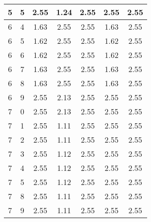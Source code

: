 \begin{longtable}{|c|c||c||c|c||c|c|}
	5 & 5 & 2.55 & 1.24 & 2.55 & 2.55 & 2.55 \\ \hline
	6 & 4 & 1.63 & 2.55 & 2.55 & 1.63 & 2.55 \\ \hline
	6 & 5 & 1.62 & 2.55 & 2.55 & 1.62 & 2.55 \\ \hline
	6 & 6 & 1.62 & 2.55 & 2.55 & 1.62 & 2.55 \\ \hline
	6 & 7 & 1.63 & 2.55 & 2.55 & 1.63 & 2.55 \\ \hline
	6 & 8 & 1.63 & 2.55 & 2.55 & 1.63 & 2.55 \\ \hline
	6 & 9 & 2.55 & 2.13 & 2.55 & 2.55 & 2.55 \\ \hline
	7 & 0 & 2.55 & 2.13 & 2.55 & 2.55 & 2.55 \\ \hline
	7 & 1 & 2.55 & 1.11 & 2.55 & 2.55 & 2.55 \\ \hline
	7 & 2 & 2.55 & 1.11 & 2.55 & 2.55 & 2.55 \\ \hline
	7 & 3 & 2.55 & 1.12 & 2.55 & 2.55 & 2.55 \\ \hline
	7 & 4 & 2.55 & 1.12 & 2.55 & 2.55 & 2.55 \\ \hline
	7 & 5 & 2.55 & 1.12 & 2.55 & 2.55 & 2.55 \\ \hline
	7 & 8 & 2.55 & 1.11 & 2.55 & 2.55 & 2.55 \\ \hline
	7 & 9 & 2.55 & 1.11 & 2.55 & 2.55 & 2.55 \\ \hline
\end{longtable}

